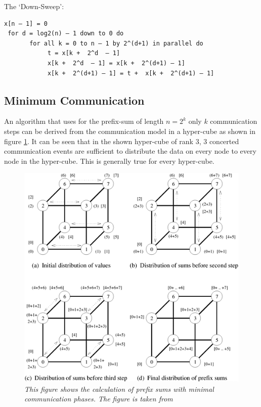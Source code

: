 \documentclass[a4paper,11pt,twoside]{article}
\begin{document}
The `Down-Sweep':
\begin{verbatim}
x[n – 1] = 0
 for d = log2(n) – 1 down to 0 do 
       for all k = 0 to n – 1 by 2^(d+1) in parallel do 
            t = x[k +  2^d  – 1]
            x[k +  2^d  – 1] = x[k +  2^(d+1) – 1]
            x[k +  2^(d+1) – 1] = t +  x[k +  2^(d+1) – 1]

\end{verbatim}

\subsection*{Minimum Communication}
An algorithm that uses for the prefix-sum of length $n = 2^k$ only $k$ communication steps can be derived from the communication model in a hyper-cube as shown in figure \ref{fig:hypercube}. It can be seen that in the shown hyper-cube of rank 3, 3 concerted communication events are sufficient to distribute the data on every node to every node in the hyper-cube. This is generally true for every hyper-cube.

\begin{figure}

  \centering
    \includegraphics[width=1\textwidth]{hypercube.png}
    \caption{\textit{This figure shows the calculation of prefix sums with minimal communication phases. The figure is taken from \cite[chap 4.3]{grama2003}}}
    \label{fig:hypercube}
\end{figure}
\end{document}
